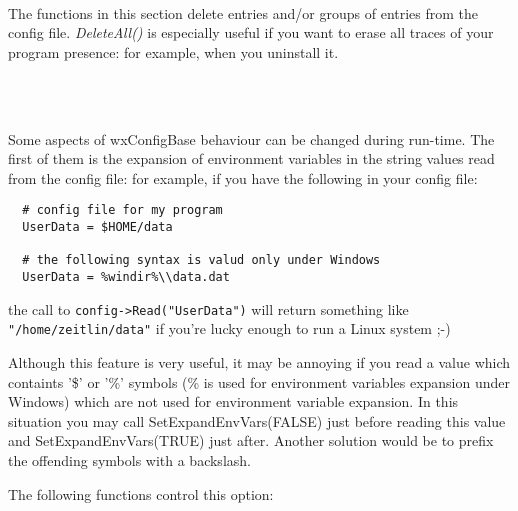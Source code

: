 \\


The functions in this section delete entries and/or groups of entries from the
config file. {\it DeleteAll()} is especially useful if you want to erase all
traces of your program presence: for example, when you uninstall it.

\\
\\


Some aspects of wxConfigBase behaviour can be changed during run-time. The
first of them is the expansion of environment variables in the string values
read from the config file: for example, if you have the following in your
config file:

\begin{verbatim}
  # config file for my program
  UserData = $HOME/data

  # the following syntax is valud only under Windows
  UserData = %windir%\\data.dat
\end{verbatim}

the call to \verb$config->Read("UserData")$ will return something like
\verb$"/home/zeitlin/data"$ if you're lucky enough to run a Linux system ;-)

Although this feature is very useful, it may be annoying if you read a value
which containts '\$' or '\%' symbols (\% is used for environment variables
expansion under Windows) which are not used for environment variable
expansion. In this situation you may call SetExpandEnvVars(FALSE) just before
reading this value and SetExpandEnvVars(TRUE) just after. Another solution
would be to prefix the offending symbols with a backslash.

The following functions control this option:

\\
\\
\\

